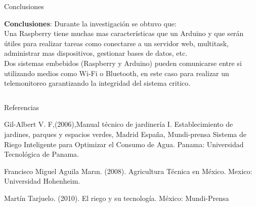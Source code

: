 \documentclass{beamer}
\begin{document}
\begin{frame}[fragile]{}
\begin{columns}[t]
	     \begin{column}{0.46\linewidth}
	     	\begin{block}{Conclusiones}\justifying
	     		\begin{minipage}[t]{0.96\textwidth}
	     			\textbf{Conclusiones}: 
	     			Durante la investigación se obtuvo que:\\
	     			Una Raspberry tiene muchas mas características que un Arduino y que serán útiles para realizar tareas como conectarse a un servidor web, multitask, administrar mas dispositivos, gestionar bases de datos, etc.
	     			\\
	     			Dos sistemas embebidos (Raspberry y Arduino) pueden comunicarse entre si utilizando medios como Wi-Fi o Bluetooth, en este caso para realizar un telemonitoreo garantizando la integridad del sistema critico.
	     			\\
	     			
	     		\end{minipage}
	     		
	     	\end{block}   
	     \end{column}
\end{columns}

\justifying
\begin{columns}[t]
 \begin{column}{0.90\linewidth}
      \begin{block}{Referencias}
	\begin{minipage}[t]{0.71\textwidth}
        \begin{small}
        \begin{thebibliography}{widestlabel}
        	 Gil-Albert V. F,(2006),Manual técnico de jardinería I. Establecimiento de jardines,
parques y espacios verdes, Madrid España, Mundi-prensa
        	 Sistema de Riego Inteligente para Optimizar el Consumo de
Agua. Panama: Universidad Tecnológica de Panama.

        	 Francisco Miguel Aguila Marın. (2008). Agricultura Técnica en México. Mexico: Universidad Hohenheim.
        	
        	
        	 Martín Tarjuelo. (2010). El riego y su tecnología. México: Mundi-Prensa
        	

\end{thebibliography}
\end{small}
\end{minipage}
\end{block}
\end{column}
\end{columns}
\end{frame}
\end{document}
